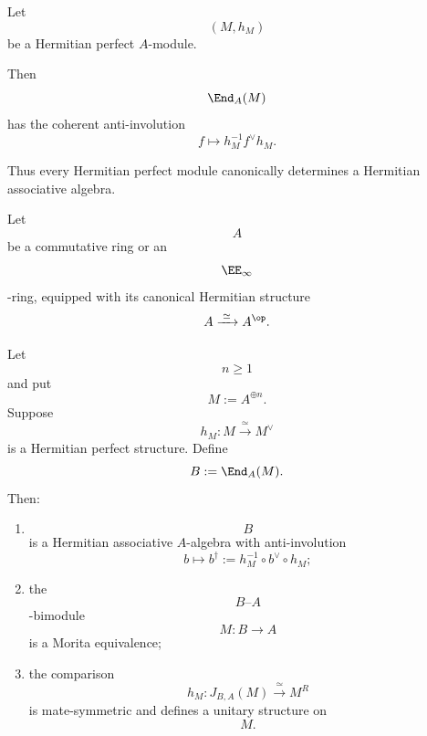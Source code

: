 \begin{example}
\label{ex:hermitian-endomorphism-algebras}
Let
\[
    (M,h_M)
\]
be a Hermitian perfect $A$-module.

Then
\[
    \End_A(M)
\]
has the coherent anti-involution
\[
    f
    \longmapsto
    h_M^{-1}f^\vee h_M.
\]

Thus every Hermitian perfect module canonically determines a Hermitian
associative algebra.
\end{example}

\begin{example}
\label{ex:matrix-hermitian-morita}
Let
\[
    A
\]
be a commutative ring or an
\[
    \EE_\infty
\]
-ring, equipped with its canonical Hermitian structure
\[
    A
    \xrightarrow{\;\simeq\;}
    A^{\op}.
\]

Let
\[
    n\geq1
\]
and put
\[
    M
    :=
    A^{\oplus n}.
\]
Suppose
\[
    h_M
    \colon
    M
    \xrightarrow{\;\simeq\;}
    M^\vee
\]
is a Hermitian perfect structure. Define
\[
    B
    :=
    \End_A(M).
\]
Then:
\begin{enumerate}[label=(\roman*)]
    \item
    \[
        B
    \]
    is a Hermitian associative $A$-algebra with anti-involution
    \[
        b
        \longmapsto
        b^\dagger
        :=
        h_M^{-1}
        \circ
        b^\vee
        \circ
        h_M;
    \]

    \item the
    \[
        B\text{--}A
    \]
    -bimodule
    \[
        M
        \colon
        B
        \longrightarrow
        A
    \]
    is a Morita equivalence;

    \item the comparison
    \[
        h_M
        \colon
        J_{B,A}(M)
        \xrightarrow{\;\simeq\;}
        M^R
    \]
    is mate-symmetric and defines a unitary structure on
    \[
        M.
    \]
\end{enumerate}
\end{example}

